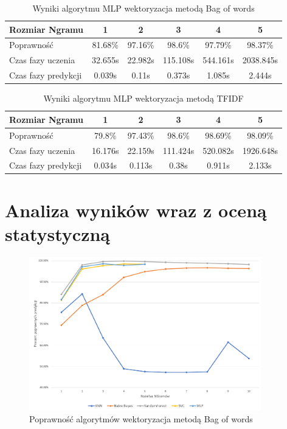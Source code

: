 \begin{table}[H]
    \centering
    \caption{Wyniki algorytmu MLP wektoryzacja metodą Bag of words}
    \begin{tabular}{ | l | c | c | c | c | c |}
        \hline
        Rozmiar Ngramu & 1 & 2 & 3 & 4 & 5  \\ \hline
        Poprawność & 81.68\% & 97.16\% & 98.6\% & 97.79\% & 98.37\%   \\ \hline
        Czas fazy uczenia & 32.655s & 22.982s & 115.108s & 544.161s & 2038.845s  \\ \hline
        Czas fazy predykcji & 0.039s & 0.11s & 0.373s & 1.085s & 2.444s  \\ \hline
    \end{tabular}
\end{table}

\begin{table}[H]
    \centering
    \caption{Wyniki algorytmu MLP wektoryzacja metodą TFIDF}
    \begin{tabular}{ | l | c | c | c | c | c |}
        \hline
        Rozmiar Ngramu & 1 & 2 & 3 & 4 & 5   \\ \hline
        Poprawność & 79.8\% & 97.43\% & 98.6\% & 98.69\% & 98.09\%   \\ \hline
        Czas fazy uczenia & 16.176s & 22.159s & 111.424s & 520.082s & 1926.648s  \\ \hline
        Czas fazy predykcji & 0.034s & 0.113s & 0.38s & 0.911s & 2.133s  \\ \hline
    \end{tabular}
\end{table}
\section{Analiza wyników wraz z oceną statystyczną}

\begin{figure}[h!]
    \centering
    \includegraphics[width=0.9\textwidth]{./Img/BOWAcc.png}
    \caption{Poprawność algorytmów wektoryzacja metodą Bag of words}
\end{figure}

